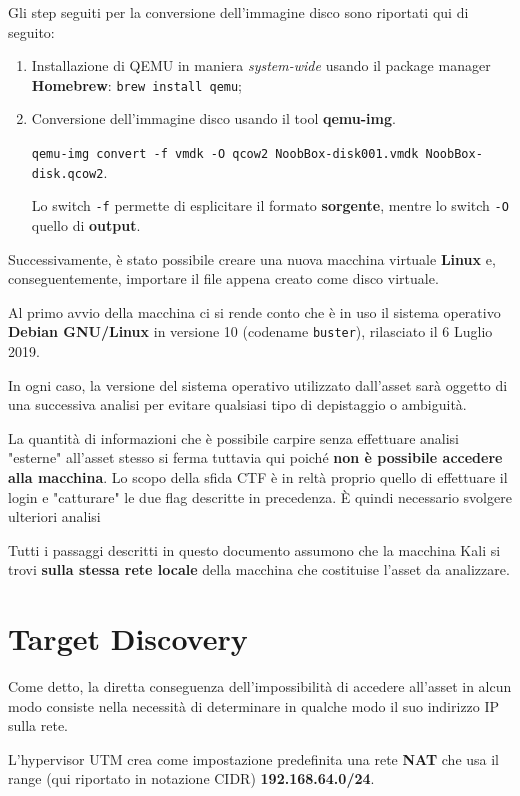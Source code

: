 \documentclass[a4paper, 12pt, oneside]{article}
\begin{document}
Gli step seguiti per la conversione dell'immagine disco sono riportati qui di seguito:

\begin{enumerate}
    \item Installazione di QEMU in maniera \textit{system-wide} usando il package manager \textbf{Homebrew}: \verb|brew install qemu|;
    \item Conversione dell'immagine disco usando il tool \textbf{qemu-img}.
    \begin{center}
        \verb|qemu-img convert -f vmdk -O qcow2 NoobBox-disk001.vmdk NoobBox-disk.qcow2|.
    \end{center}
    Lo switch \texttt{-f} permette di esplicitare il formato \textbf{sorgente}, mentre lo switch \texttt{-O} quello di \textbf{output}.
\end{enumerate}

Successivamente, è stato possibile creare una nuova macchina virtuale \textbf{Linux} e, conseguentemente, importare il file appena creato come disco virtuale.

Al primo avvio della macchina ci si rende conto che è in uso il sistema operativo \textbf{Debian GNU\slash Linux} in versione 10 (codename \texttt{buster}), rilasciato il 6 Luglio 2019. \cite{debian}

In ogni caso, la versione del sistema operativo utilizzato dall'asset sarà oggetto di una successiva analisi per evitare qualsiasi tipo di depistaggio o ambiguità.

La quantità di informazioni che è possibile carpire senza effettuare analisi "esterne" all'asset stesso si ferma tuttavia qui poiché \textbf{non è possibile accedere alla macchina}. Lo scopo della sfida CTF è in reltà proprio quello di effettuare il login e "catturare" le due flag descritte in precedenza. È quindi necessario svolgere ulteriori analisi

Tutti i passaggi descritti in questo documento assumono che la macchina Kali si trovi \textbf{sulla stessa rete locale} della macchina che costituise l'asset da analizzare.

\section{Target Discovery}
Come detto, la diretta conseguenza dell'impossibilità di accedere all'asset in alcun modo consiste nella necessità di determinare in qualche modo il suo indirizzo IP sulla rete.

L'hypervisor UTM crea come impostazione predefinita una rete \textbf{NAT} che usa il range (qui riportato in notazione CIDR) \textbf{192.168.64.0\slash24}.
\end{document}
